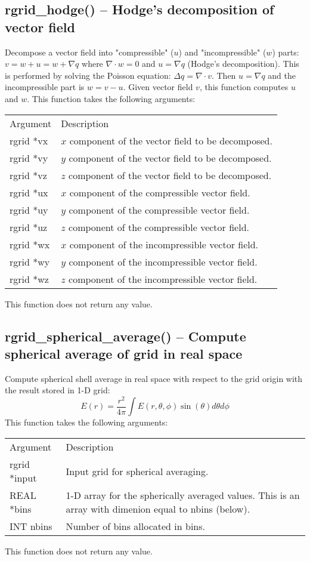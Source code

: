 \documentclass[12pt,letterpaper]{report}
\begin{document}
\subsection{rgrid\_hodge() -- Hodge's decomposition of vector field}

Decompose a vector field into "compressible" ($u$) and "incompressible" ($w$) parts: $v = w + u = w + \nabla q$ where $\nabla\cdot w = 0$ and $u = \nabla q$ (Hodge's decomposition). This is performed by solving the Poisson equation: $\Delta q = \nabla\cdot v$. Then $u = \nabla q$ and the incompressible part is $w = v - u$. Given vector field $v$, this function computes $u$ and $w$. This function takes the following arguments:
\begin{longtable}{p{} p{}}
Argument & Description\\
\cline{1-2}
rgrid *vx & $x$ component of the vector field to be decomposed.\\
rgrid *vy & $y$ component of the vector field to be decomposed.\\
rgrid *vz & $z$ component of the vector field to be decomposed.\\
rgrid *ux & $x$ component of the compressible vector field.\\
rgrid *uy & $y$ component of the compressible vector field.\\
rgrid *uz & $z$ component of the compressible vector field.\\
rgrid *wx & $x$ component of the incompressible vector field.\\
rgrid *wy & $y$ component of the incompressible vector field.\\
rgrid *wz & $z$ component of the incompressible vector field.\\
\end{longtable}
\noindent
This function does not return any value.

\subsection{rgrid\_spherical\_average() -- Compute spherical average of grid in real space}

Compute spherical shell average in real space with respect to the grid origin with the result stored in 1-D grid:
$$E(r) = \frac{r^2}{4\pi} \int E(r, \theta, \phi) \sin(\theta) d\theta d\phi$$
This function takes the following arguments:
\begin{longtable}{p{} p{}}
Argument & Description\\
\cline{1-2}
rgrid *input & Input grid for spherical averaging.\\
REAL *bins & 1-D array for the spherically averaged values. This is an array with dimenion equal to nbins (below).\\
INT nbins & Number of bins allocated in bins.\\
\end{longtable}
\noindent
This function does not return any value.
\end{document}

